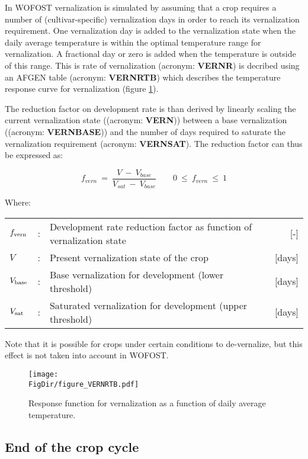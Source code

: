 In WOFOST vernalization is simulated by assuming that a crop requires a number of (cultivar-specific)
vernalization days in order to reach its vernalization requirement. One vernalization day is added to the 
vernalization state 
when the daily average temperature is within the optimal temperature range for vernalization. A fractional
day or zero  is added when the temperature is outside of this range. This is rate of vernalization
(acronym: {\bf VERNR}) is decribed using an AFGEN table (acronym:  {\bf VERNRTB}) which describes the
temperature response curve for vernalization (figure \ref{fig:VERNRTB}).

The reduction factor on development rate is than derived by linearly scaling the current vernalization state 
((acronym:  {\bf VERN}))  between a base vernalization ((acronym:  {\bf VERNBASE})) and the number of 
days required to saturate the vernalization requirement (acronym:  {\bf VERNSAT}). The reduction 
factor can thus be expressed as: 

\begin{equation}
\label{eq:vern_factor}
f_{vern} ~=~{\frac{V ~-~V_{base} }{V _{sat} ~-~ V_{base} }} ~~~~~~~~~0~\le ~f _{vern} ~\le ~1
\end{equation}

Where:\\[5pt]
\begin{tabularx}{\textwidth}{llXr}
	$f_{{\rm vern}}$ &:& Development rate reduction factor as function of vernalization state   &     [-]\\
	$V$ &:& Present vernalization state of the crop   &     [days]\\
	$V_{{\rm base}}$ &:& Base vernalization for development (lower threshold)    &    [days]\\
	$V_{{\rm sat}}$ &:& Saturated vernalization for development (upper threshold)    &    [days]\\
\end{tabularx}

Note that it is possible for crops under certain conditions to de-vernalize, but this effect is not taken
into account in WOFOST.

\begin{figure}[p]
	\centering
	\texttt{[image: \\FigDir/figure\_VERNRTB.pdf]}
	\caption{Response function for vernalization as a function
	of daily average temperature.} 
	\label{fig:VERNRTB}
\end{figure}

\subsection{End of the crop cycle}


